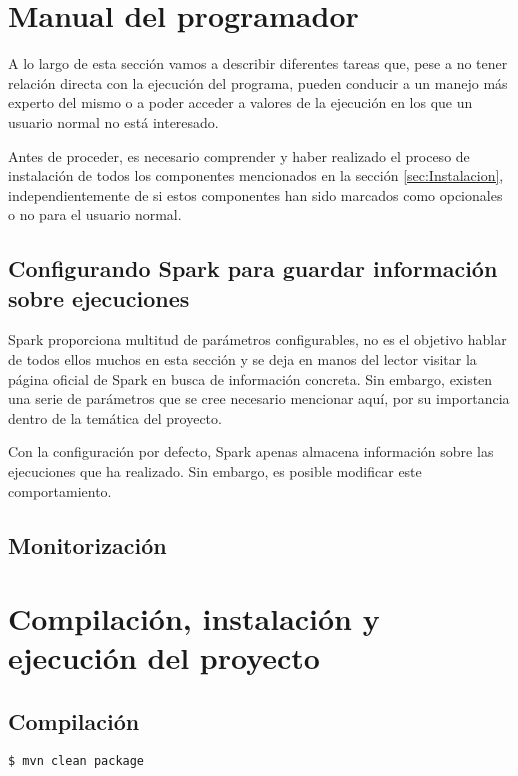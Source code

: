 \section{Manual del programador}

A lo largo de esta sección vamos a describir diferentes tareas que, pese a no tener 
relación directa con la ejecución del programa, pueden conducir a un manejo más experto del mismo o a poder acceder a valores de la ejecución en los que un usuario normal no está interesado.

Antes de proceder, es necesario comprender y haber realizado el proceso de instalación de todos los componentes mencionados en la sección \ref{sec:Instalacion}, independientemente de si estos componentes han sido marcados como opcionales o no para el usuario normal.

\subsection{Configurando Spark para guardar información sobre ejecuciones}\label{subsec:configurandoSpark}

Spark proporciona multitud de parámetros configurables, no es el objetivo hablar de todos ellos muchos en esta sección y se deja en manos del lector visitar la página oficial de Spark en busca de información concreta. Sin embargo, existen una serie de parámetros que se cree necesario mencionar aquí, por su importancia dentro de la temática del proyecto.

Con la configuración por defecto, Spark apenas almacena información sobre las ejecuciones que ha realizado. Sin embargo, es posible modificar este comportamiento.



\subsection{Monitorización}

\section{Compilación, instalación y ejecución del proyecto}

\subsection{Compilación}

\begin{lstlisting}[language=bash]
$ mvn clean package
\end{lstlisting}

